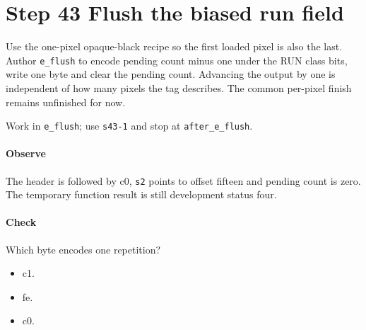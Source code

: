 \section{Step 43 Flush the biased run field}\label{qoi-s43}
Use the one-pixel opaque-black recipe so the first loaded pixel is also the last. Author \texttt{e\_flush} to encode pending count minus one under the RUN class bits, write one byte and clear the pending count. Advancing the output by one is independent of how many pixels the tag describes. The common per-pixel finish remains unfinished for now.

Work in \texttt{e\_flush}; use \texttt{s43-1} and stop at \texttt{after\_e\_flush}.

\paragraph{Observe} The header is followed by c0, \texttt{s2} points to offset fifteen and pending count is zero. The temporary function result is still development status four.

\paragraph{Check} Which byte encodes one repetition?
\begin{itemize}
  \item[A.] c1.
  \item[B.] fe.
  \item[C.] c0.
\end{itemize}
